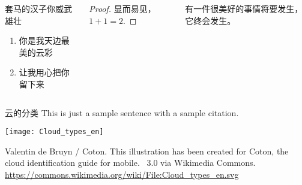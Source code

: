 \documentclass[t,linespread=1.3]{ctexbeamer}
\begin{document}
\begin{frame}[fragile]
\begin{columns}[T]
\begin{block}{套马的汉子你威武雄壮}
  \begin{enumerate}
      \item 你是我天边最美的云彩
      \item 让我用心把你留下来
  \end{enumerate}
\end{block}

\begin{proof}
    显而易见，$1+1=2$.
\end{proof}

\begin{theorem}
    有一件很美好的事情将要发生，它终会发生。
\end{theorem}

\end{columns}

\begin{block}{云的分类}
This is just a sample sentence with a sample citation\cite{BurroughsCrowder2007}.

\smallskip 
\texttt{[image: Cloud\_types\_en]}\par
Valentin de Bruyn / Coton. This illustration has been created for Coton, the cloud identification guide for mobile. \ccbysa\ 3.0 via Wikimedia Commons. \url{https://commons.wikimedia.org/wiki/File:Cloud_types_en.svg}
\end{block}

\vfill

\begin{block}{\refname}
\printbibliography[heading=none]
\end{block}

\end{frame}
\end{document}
